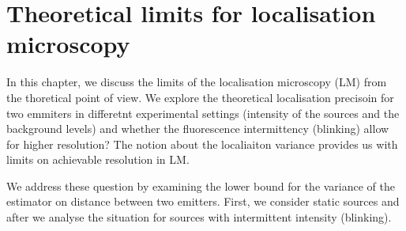 \chapter{Theoretical limits for localisation microscopy \label{sec:Theoretical-limits-of teh LM}}

%
%
%
%
%
%
%
%
%
%

In this chapter, we discuss the limits of the localisation microscopy (LM) from the thoretical point of view. We explore the theoretical localisation precisoin for two emmiters in differetnt experimental settings (intensity of the sources and the background levels) and whether the fluorescence intermittency (blinking) allow for higher resolution? The notion about the localiaiton variance provides us with limits on achievable resolution in LM.

We address these question by examining the \CR lower bound for the variance of the estimator on distance between two emitters. First, we consider static sources and after we analyse the situation for sources with intermittent intensity (blinking). 

